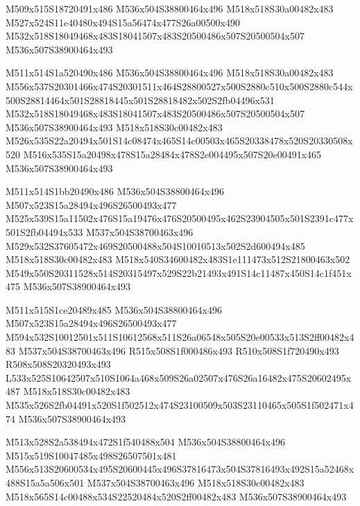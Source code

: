 \documentclass{article}
\begin{document}
\begin{multicols}{5}
\begin{center}

M509x515S18720491x486 %
M536x504S38800464x496 %
M518x518S30a00482x483 %
M527x524S11e40480x494S15a56474x477S26a00500x490 %
M532x518S18049468x483S18041507x483S20500486x507S20500504x507 %
M536x507S38900464x493 %
\vfil
\columnbreak

M511x514S1a520490x486 %
M536x504S38800464x496 %
M518x518S30a00482x483 %
M556x537S20301466x474S20301511x464S28800527x500S2880c510x500S2880c544x500S28814464x501S28818445x501S28818482x502S2fb04496x531 %
M532x518S18049468x483S18041507x483S20500486x507S20500504x507 %
M536x507S38900464x493 %
M518x518S30c00482x483 %
M526x535S22a20494x501S14c08474x465S14c00503x465S20338478x520S20330508x520 %
M516x535S15a20498x478S15a28484x478S2e004495x507S20e00491x465 %
M536x507S38900464x493 %
\vfil
\columnbreak

M511x514S1bb20490x486 %
M536x504S38800464x496 %
M507x523S15a28494x496S26500493x477 %
M525x539S15a11502x476S15a19476x476S20500495x462S23904505x501S2391c477x501S2fb04494x533 %
M537x504S38700463x496 %
M529x532S37605472x469S20500488x504S10010513x502S2d600494x485 %
M518x518S30c00482x483 %
M518x540S34600482x483S1e111473x512S21800463x502 %
M549x550S20311528x514S20315497x529S22b21493x491S14c11487x450S14c1f451x475 %
M536x507S38900464x493 %
\vfil
\columnbreak

M511x515S1ce20489x485 %
M536x504S38800464x496 %
M507x523S15a28494x496S26500493x477 %
M594x532S10012501x511S10612568x511S26a06548x505S20e00533x513S2ff00482x483 %
M537x504S38700463x496 %
R515x508S1f000486x493 %
R510x508S1f720490x493 %
R508x508S20320493x493 %
L533x525S10642507x510S1064a468x509S26a02507x476S26a16482x475S20602495x487 %
M518x518S30c00482x483 %
M535x526S2fb04491x520S1f502512x474S23100509x503S23110465x505S1f502471x474 %
M536x507S38900464x493 %
\vfil
\columnbreak

M513x528S2a538494x472S1f540488x504 %
M536x504S38800464x496 %
M515x519S10047485x498S26507501x481 %
M556x513S20600534x495S20600445x496S37816473x504S37816493x492S15a52468x488S15a5a506x501 %
M537x504S38700463x496 %
M518x518S30c00482x483 %
M518x565S14c00488x534S22520484x520S2ff00482x483 %
M536x507S38900464x493 %
\vfil

\end{center}
\end{multicols}
\end{document}
